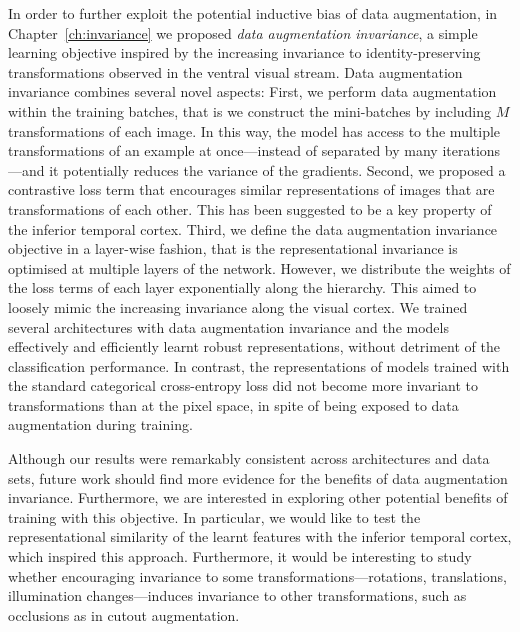 {In order to further exploit the potential inductive bias of data augmentation, in Chapter~\ref{ch:invariance} we proposed \textit{data augmentation invariance}, a simple learning objective inspired by the increasing invariance to identity-preserving transformations observed in the ventral visual stream. Data augmentation invariance combines several novel aspects: First, we perform data augmentation within the training batches, that is we construct the mini-batches by including $M$ transformations of each image. In this way, the model has access to the multiple transformations of an example at once---instead of separated by many iterations---and it potentially reduces the variance of the gradients. Second, we proposed a contrastive loss term that encourages similar representations of images that are transformations of each other. This has been suggested to be a key property of the inferior temporal cortex. Third, we define the data augmentation invariance objective in a layer-wise fashion, that is the representational invariance is optimised at multiple layers of the network. However, we distribute the weights of the loss terms of each layer exponentially along the hierarchy. This aimed to loosely mimic the increasing invariance along the visual cortex. We trained several architectures with data augmentation invariance and the models effectively and efficiently learnt robust representations, without detriment of the classification performance. In contrast, the representations of models trained with the standard categorical cross-entropy loss did not become more invariant to transformations than at the pixel space, in spite of being exposed to data augmentation during training.

Although our results were remarkably consistent across architectures and data sets, future work should find more evidence for the benefits of data augmentation invariance. Furthermore, we are interested in exploring other potential benefits of training with this objective. In particular, we would like to test the representational similarity of the learnt features with the inferior temporal cortex, which inspired this approach. Furthermore, it would be interesting to study whether encouraging invariance to some transformations---rotations, translations, illumination changes---induces invariance to other transformations, such as occlusions as in cutout augmentation.

}
